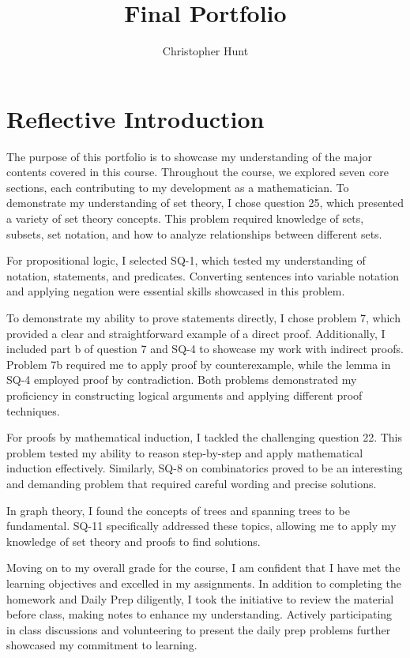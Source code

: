 \documentclass{article}
\title{Final Portfolio}
\author{Christopher Hunt}
\date{}
\begin{document}
\pagestyle{fancy}
\fancyhf{}
\rhead{\thepage}
\maketitle

\section*{Reflective Introduction}
The purpose of this portfolio is to showcase my understanding of the major contents covered in this course. Throughout the course, we explored seven core sections, each contributing to my development as a mathematician. To demonstrate my understanding of set theory, I chose question 25, which presented a variety of set theory concepts. This problem required knowledge of sets, subsets, set notation, and how to analyze relationships between different sets.

For propositional logic, I selected SQ-1, which tested my understanding of notation, statements, and predicates. Converting sentences into variable notation and applying negation were essential skills showcased in this problem.

To demonstrate my ability to prove statements directly, I chose problem 7, which provided a clear and straightforward example of a direct proof. Additionally, I included part b of question 7 and SQ-4 to showcase my work with indirect proofs. Problem 7b required me to apply proof by counterexample, while the lemma in SQ-4 employed proof by contradiction. Both problems demonstrated my proficiency in constructing logical arguments and applying different proof techniques.

For proofs by mathematical induction, I tackled the challenging question 22. This problem tested my ability to reason step-by-step and apply mathematical induction effectively. Similarly, SQ-8 on combinatorics proved to be an interesting and demanding problem that required careful wording and precise solutions.

In graph theory, I found the concepts of trees and spanning trees to be fundamental. SQ-11 specifically addressed these topics, allowing me to apply my knowledge of set theory and proofs to find solutions.

Moving on to my overall grade for the course, I am confident that I have met the learning objectives and excelled in my assignments. In addition to completing the homework and Daily Prep diligently, I took the initiative to review the material before class, making notes to enhance my understanding. Actively participating in class discussions and volunteering to present the daily prep problems further showcased my commitment to learning.
\end{document}
